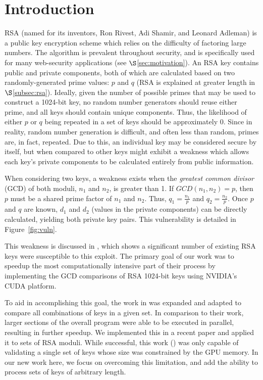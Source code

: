 \documentclass[smallextended]{svjour3}       %
\begin{document}
\section{Introduction}
\label{sec:intro}
RSA (named for its inventors, Ron Rivest, Adi Shamir, and Leonard Adleman) is a
public key encryption scheme which relies on the difficulty of factoring large
numbers. The algorithm is prevalent throughout security, and is specifically
used for many web-security applications (see $\S$\ref{sec:motivation}). An RSA
key contains public and private components, both of which are calculated based
on two randomly-generated prime values: $p$ and $q$ (RSA is explained at
greater length in $\S$\ref{subsec:rsa}). Ideally, given the number of possible
primes that may be used to construct a 1024-bit key, no random number
generators should reuse either prime, and all keys should contain unique
components. Thus, the likelihood of either $p$ or $q$ being repeated in a set
of keys should be approximately 0. Since in reality, random number generation
is difficult, and often less than random, primes are, in fact, repeated. Due to
this, an individual key may be considered secure by itself, but when compared
to other keys might exhibit a weakness which allows each key's private
components to be calculated entirely from public information.  

When considering two keys, a weakness exists when the \textit{greatest common 
divisor} (GCD) of both moduli, $n_1$ and $n_2$, is greater than 1. If $GCD(n_1, 
n_2) = p$, then $p$ must be a shared prime factor of $n_1$ and $n_2$. Thus, 
$q_1 = \frac{n_1}{p}$ and $q_2 = \frac{n_2}{p}$. Once $p$ and $q$ are known,
$d_1$ and $d_2$ (values in the private components) can be directly calculated,
yielding both private key pairs. This vulnerability is detailed in
Figure~\ref{fig:vuln}.

This weakness is discussed in \cite{lenstra2012ron}, which shows a significant
number of existing RSA keys were susceptible to this exploit. The primary goal
of our work was to speedup the most computationally intensive part of their
process by implementing the GCD comparisons of RSA 1024-bit keys using NVIDIA's
CUDA platform.

To aid in accomplishing this goal, the work in \cite{fujimoto2009high} was 
expanded and adapted to compare all combinations of keys in a given set. In 
comparison to their work, larger sections of the overall program were able to 
be executed in parallel, resulting in further speedup. We implemented this in a
recent paper and applied it to sets of RSA moduli. While successful, this work
(\cite{scharfglass2012breaking}) was only capable of validating a single set of
keys whose size was constrained by the GPU memory. In our new work here, we
focus on overcoming this limitation, and add the ability to process sets of
keys of arbitrary length.
\end{document}
